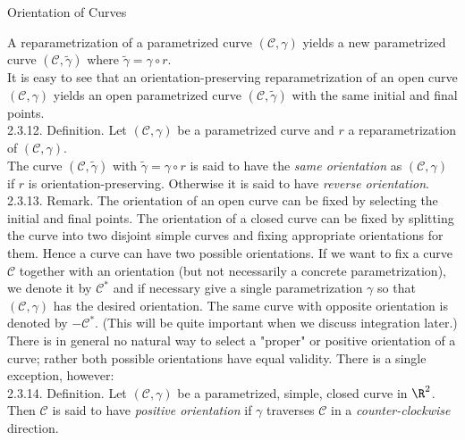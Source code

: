 \documentclass[smaller,hyperref={CJKbookmarks=true}]{beamer}
\begin{document}
\begin{frame}{Orientation of Curves}
\begin{spacing}{1.05}
A reparametrization of a parametrized curve $(\mathcal{C},\gamma)$ yields a new parametrized curve $(\mathcal{C},\widetilde{\gamma})$ where $\widetilde{\gamma}=\gamma\circ r$.\\[5pt]
It is easy to see that an orientation-preserving reparametrization of an
open curve $(\mathcal{C},\gamma)$ yields an open parametrized curve $(\mathcal{C},\widetilde{\gamma})$ with the same initial and final points.\\[6pt]
\alert{2.3.12. Definition.} Let $(\mathcal{C},\gamma)$ be a parametrized curve and $r$ a reparametrization of $(\mathcal{C},\gamma)$.\\[4pt]
The curve $(\mathcal{C},\widetilde{\gamma})$ with $\widetilde{\gamma}=\gamma\circ r$ is said to have the \emph{same orientation} as $(\mathcal{C},\gamma)$ if $r$ is orientation-preserving. Otherwise it is said to have \emph{reverse orientation}.\\[5pt]
\alert{2.3.13. Remark.} The orientation of an open curve can be fixed by selecting
the initial and final points. The orientation of a closed curve can be fixed
by splitting the curve into two disjoint simple curves and fixing appropriate
orientations for them.
\newpage
Hence a curve can have two possible orientations. If we want to fix a curve
$\mathcal{C}$ together with an orientation (but not necessarily a concrete
parametrization), we denote it by $\mathcal{C}^*$ and if necessary give a single
parametrization $\gamma$
 so that $(\mathcal{C},\gamma)$ has the desired orientation. The same
curve with opposite orientation is denoted by $-\mathcal{C}^*$. (This will be quite
important when we discuss integration later.)\\[4pt]
There is in general no natural way to select a "proper" or positive
orientation of a curve; rather both possible orientations have equal validity.
There is a single exception, however:\\[4pt]
\alert{2.3.14. Definition.} Let $(\mathcal{C},\gamma)$ be a parametrized, simple, closed curve in $\R^2$. Then $\mathcal{C}$ is said to have \emph{positive orientation} if $\gamma$ traverses $\mathcal{C}$ in a \emph{counter-clockwise} direction.
\end{spacing}
\end{frame}
\end{document}

